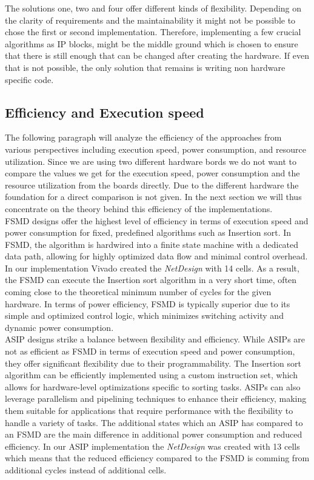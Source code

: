 \documentclass[conference]{IEEEtran}
\begin{document}
The solutions one, two and four offer different kinds of flexibility. Depending on the clarity of requirements and the maintainability it might not be possible to chose the first or second implementation. Therefore, implementing a few crucial algorithms as IP blocks, might be the middle ground which is chosen to ensure that there is still enough that can be changed after creating the hardware. If even that is not possible, the only solution that remains is writing non hardware specific code.

\subsection{Efficiency and Execution speed}
The following paragraph will analyze the efficiency of the approaches from various perspectives including execution speed, power consumption, and resource utilization. Since we are using two different hardware bords we do not want to compare the values we get for the execution speed, power consumption and the resource utilization from the boards directly. Due to the different hardware the foundation for a direct comparison is not given. In the next section we will thus concentrate on the theory behind this efficiency of the implementations.\\
FSMD designs offer the highest level of efficiency in terms of execution speed and power consumption for fixed, predefined algorithms such as Insertion sort. In FSMD, the algorithm is hardwired into a finite state machine with a dedicated data path, allowing for highly optimized data flow and minimal control overhead. In our implementation Vivado created the \textit{NetDesign} with 14 cells. As a result, the FSMD can execute the Insertion sort algorithm in a very short time, often coming close to the theoretical minimum number of cycles for the given hardware. In terms of power efficiency, FSMD is typically superior due to its simple and optimized control logic, which minimizes switching activity and dynamic power consumption.\\
ASIP designs strike a balance between flexibility and efficiency. While ASIPs are not as efficient as FSMD in terms of execution speed and power consumption, they offer significant flexibility due to their programmability. The Insertion sort algorithm can be efficiently implemented using a custom instruction set, which allows for hardware-level optimizations specific to sorting tasks. ASIPs can also leverage parallelism and pipelining techniques to enhance their efficiency, making them suitable for applications that require performance with the flexibility to handle a variety of tasks. The additional states which an ASIP has compared to an FSMD are the main difference in additional power consumption and reduced efficiency. In our ASIP implementation the \textit{NetDesign} was created with 13 cells which means that the reduced efficiency compared to the FSMD is comming from additional cycles instead of additional cells.\\
\end{document}
